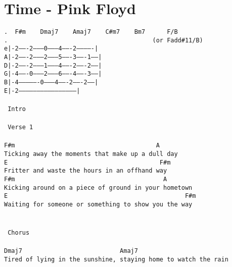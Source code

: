 \newpage
\section{Time - Pink Floyd}
\label{Time - Pink Floyd}
\texttt{.\ \ F\#m\ \ \ \ Dmaj7\ \ \ \ Amaj7\ \ \ \ C\#m7\ \ \ \ Bm7\ \ \ \ \ \ F/B\\
.\ \ \ \ \ \ \ \ \ \ \ \ \ \ \ \ \ \ \ \ \ \ \ \ \ \ \ \ \ \ \ \ \ \ \ \ \ \ \ \ (or\ Fadd\#11/B)\\
e|-2-------2--------0--------4-------2-------------|\\
A|-2-------2--------2--------5-------3-------1-----|\\
D|-2-------2--------1--------4-------2-------2-----|\\
G|-4-------0--------2--------6-------4-------3-----|\\
B|-4----------------0--------4-------2-------2-----|\\
E|-2-----------------------------------------------|\\
\\
\lbrack\ Intro\rbrack\\
\\
\lbrack\ Verse\ 1\rbrack\\
\\
F\#m\ \ \ \ \ \ \ \ \ \ \ \ \ \ \ \ \ \ \ \ \ \ \ \ \ \ \ \ \ \ \ \ \ \ \ \ \ \ \ A\\
Ticking\ away\ the\ moments\ that\ make\ up\ a\ dull\ day\\
E\ \ \ \ \ \ \ \ \ \ \ \ \ \ \ \ \ \ \ \ \ \ \ \ \ \ \ \ \ \ \ \ \ \ \ \ \ \ \ \ \ \ F\#m\\
Fritter\ and\ waste\ the\ hours\ in\ an\ offhand\ way\\
F\#m\ \ \ \ \ \ \ \ \ \ \ \ \ \ \ \ \ \ \ \ \ \ \ \ \ \ \ \ \ \ \ \ \ \ \ \ \ \ \ \ \ A\\
Kicking\ around\ on\ a\ piece\ of\ ground\ in\ your\ hometown\\
E\ \ \ \ \ \ \ \ \ \ \ \ \ \ \ \ \ \ \ \ \ \ \ \ \ \ \ \ \ \ \ \ \ \ \ \ \ \ \ \ \ \ \ \ \ \ \ \ \ F\#m\\
Waiting\ for\ someone\ or\ something\ to\ show\ you\ the\ way\\
\\
\\
\lbrack\ Chorus\rbrack\\
\\
Dmaj7\ \ \ \ \ \ \ \ \ \ \ \ \ \ \ \ \ \ \ \ \ \ \ \ \ \ \ Amaj7\\
Tired\ of\ lying\ in\ the\ sunshine,\ staying\ home\ to\ watch\ the\ rain\\
}
